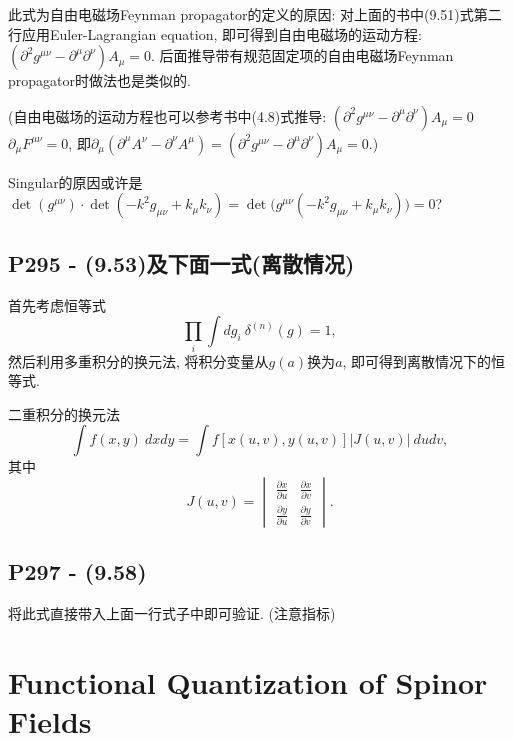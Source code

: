 此式为自由电磁场Feynman propagator的定义的原因: 对上面的书中(9.51)式第二行应用Euler-Lagrangian equation, 即可得到自由电磁场的运动方程: $(\partial^2 g^{\mu\nu} - \partial^\mu \partial^\nu)A_\mu  = 0$. 后面推导带有规范固定项的自由电磁场Feynman propagator时做法也是类似的.

(自由电磁场的运动方程也可以参考书中(4.8)式推导: $(\partial^2 g^{\mu\nu} - \partial^\mu \partial^\nu)A_\mu  = 0$$\partial_\mu F^{\mu\nu} = 0$, 即$\partial_\mu (\partial^\mu A^\nu - \partial^\nu A^\mu) = (\partial^2 g^{\mu\nu} - \partial^\mu \partial^\nu)A_\mu  = 0$.)

  Singular的原因或许是$\det{(g^{\mu\nu})}\cdot \det{(-k^2g_{\mu\nu}+k_\mu k_\nu)} = \det{\bigl(g^{\mu\nu}(-k^2g_{\mu\nu}+k_\mu k_\nu)\bigr)} = 0$?

  \subsection{P295 - (9.53)及下面一式(离散情况)}

  首先考虑恒等式
  \begin{equation}
    \prod_{i} \int dg_i\ \delta^{(n)}(g) = 1,
  \end{equation}
  然后利用多重积分的换元法, 将积分变量从$g(a)$换为$a$, 即可得到离散情况下的恒等式.

  \begin{mybox}{二重积分的换元法}
    \begin{equation}
      \int f(x, y)\ dxdy = \int f[x(u, v), y(u, v)]|J(u, v)|\ dudv,
    \end{equation}
    其中
    \begin{equation}
      J(u, v)=\begin{vmatrix}
        \frac{\partial x}{\partial u} & \frac{\partial x}{\partial v} \\
        \frac{\partial y}{\partial u} & \frac{\partial y}{\partial v}
      \end{vmatrix}.
    \end{equation}
  \end{mybox}

  \subsection{P297 - (9.58)}

  将此式直接带入上面一行式子中即可验证. (注意指标)

  \section{Functional Quantization of Spinor Fields}

